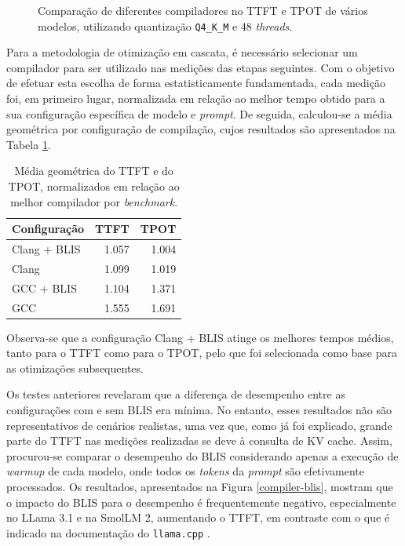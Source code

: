 \documentclass[11pt, a4paper]{article}
\begin{document}
\begin{figure}[H]
    \centering
    
    
    \caption{
        \onehalfspacing
        Comparação de diferentes compiladores no TTFT e TPOT de vários modelos, utilizando
        quantização \texttt{Q4\_K\_M} e 48 \emph{threads}.
    }
    \label{compiler-results}
\end{figure}

Para a metodologia de otimização em cascata, é necessário selecionar um compilador para ser
utilizado nas medições das etapas seguintes. Com o objetivo de efetuar esta escolha de forma
estatisticamente fundamentada, cada medição foi, em primeiro lugar, normalizada em relação ao melhor
tempo obtido para a sua configuração específica de modelo e \emph{prompt}. De seguida, calculou-se a
média geométrica por configuração de compilação, cujos resultados são apresentados na Tabela
\ref{compiler-geomean}.

\begin{table}[H]
    \centering
    \begin{tabular}{|l|r|r|}
        \hline
        \textbf{Configuração} & \textbf{TTFT} & \textbf{TPOT} \\ \hline
        Clang + BLIS          &         1.057 &         1.004 \\ \hline
        Clang                 &         1.099 &         1.019 \\ \hline
        GCC + BLIS            &         1.104 &         1.371 \\ \hline
        GCC                   &         1.555 &         1.691 \\ \hline
    \end{tabular}
    \caption{
        \onehalfspacing
        Média geométrica do TTFT e do TPOT, normalizados em relação ao melhor compilador por
        \emph{benchmark}.
    }
    \label{compiler-geomean}
\end{table}

Observa-se que a configuração Clang + BLIS atinge os melhores tempos médios, tanto para o TTFT como
para o TPOT, pelo que foi selecionada como base para as otimizações subsequentes.

Os testes anteriores revelaram que a diferença de desempenho entre as configurações com e sem BLIS
era mínima. No entanto, esses resultados não são representativos de cenários realistas, uma vez que,
como já foi explicado, grande parte do TTFT nas medições realizadas se deve à consulta de KV cache.
Assim, procurou-se comparar o desempenho do BLIS considerando apenas a execução de \emph{warmup} de
cada modelo, onde todos os \emph{tokens} da \emph{prompt} são efetivamente processados. Os
resultados, apresentados na Figura \ref{compiler-blis}, mostram que o impacto do BLIS para o
desempenho é frequentemente negativo, especialmente no LLama 3.1 e na SmolLM 2, aumentando o TTFT,
em contraste com o que é indicado na documentação do \texttt{llama.cpp} \cite{llama-build}.
\end{document}
